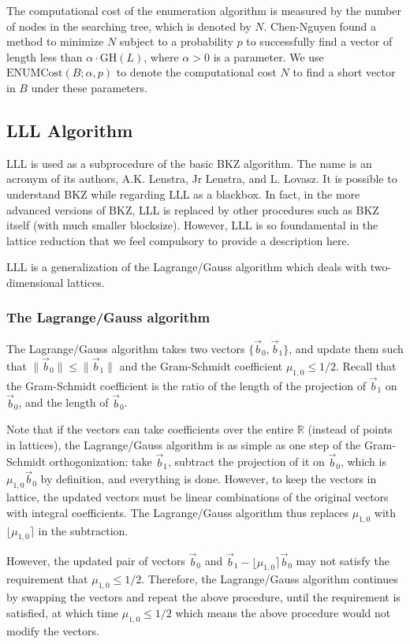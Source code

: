 \documentclass[11pt]{article}
\newcommand{\bbR}{\mathbb{R}}
\newcommand{\vb}{\vec{b}}
\newcommand{\GH}{\mathrm{GH}}
\newcommand{\ENUMCost}{\mathrm{ENUMCost}}
\begin{document}
The computational cost of the enumeration algorithm is measured by the number of nodes in the searching tree, which is denoted by $N$.
Chen-Nguyen found a method to minimize $N$ subject to a probability $p$ to successfully find a vector of length less than $\alpha\cdot\GH(L)$, where $\alpha >0$ is a parameter.
We use $\ENUMCost(B;\alpha,p)$ to denote the computational cost $N$ to find a short vector in $B$ under these parameters.

\subsection{LLL Algorithm}

LLL is used as a subprocedure of the basic BKZ algorithm.
The name is an acronym of its authors, A.K. Lenstra, Jr Lenstra, and L. Lovasz.
It is possible to understand BKZ while regarding LLL as a blackbox.
In fact, in the more advanced versions of BKZ, LLL is replaced by other procedures such as BKZ itself (with much smaller blocksize).
However, LLL is so foundamental in the lattice reduction that we feel compulsory to provide a description here.

LLL is a generalization of the Lagrange/Gauss algorithm which deals with two-dimensional lattices.

\subsubsection{The Lagrange/Gauss algorithm}

The Lagrange/Gauss algorithm takes two vectors $\{\vb_0,\vb_1\}$, and update them such that $\|\vb_0\|\leq\|\vb_1\|$ and the Gram-Schmidt coefficient $\mu_{1,0}\leq1/2$. Recall that the Gram-Schmidt coefficient is the ratio of the length of the projection of $\vb_1$ on $\vb_0$, and the length of $\vb_0$.

Note that if the vectors can take coefficients over the entire $\bbR$ (instead of points in lattices), the Lagrange/Gauss algorithm is as simple as one step of the Gram-Schmidt orthogonization: take $\vb_1$, subtract the projection of it on $\vb_0$, which is $\mu_{1,0}\vb_0$ by definition, and everything is done.
However, to keep the vectors in lattice, the updated vectors must be linear combinations of the original vectors with integral coefficients.
The Lagrange/Gauss algorithm thus replaces $\mu_{1,0}$ with $\lfloor\mu_{1,0}\rceil$ in the subtraction.

However, the updated pair of vectors $\vb_0$ and $\vb_1-\lfloor\mu_{1,0}\rceil\vb_0$ may not satisfy the requirement that $\mu_{1,0}\leq1/2$. Therefore, the Lagrange/Gauss algorithm continues by swapping the vectors and repeat the above procedure, until the requirement is satisfied, at which time $\mu_{1,0}\leq 1/2$ which means the above procedure would not modify the vectors.
\end{document}
